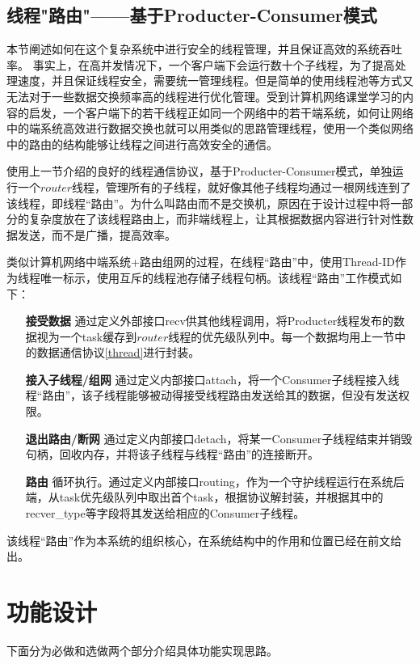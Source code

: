 \documentclass[UTF8]{ctexart}
\begin{document}
\subsection{线程"路由"——基于Producter-Consumer模式}\label{router}
本节阐述如何在这个复杂系统中进行安全的线程管理，并且保证高效的系统吞吐率。
事实上，在高并发情况下，一个客户端下会运行数十个子线程，为了提高处理速度，并且保证线程安全，需要统一管理线程。但是简单的使用线程池等方式又无法对于一些数据交换频率高的线程进行优化管理。受到计算机网络课堂学习的内容的启发，一个客户端下的若干线程正如同一个网络中的若干端系统，如何让网络中的端系统高效进行数据交换也就可以用类似的思路管理线程，使用一个类似网络中的路由的结构能够让线程之间进行高效安全的通信。

使用上一节介绍的良好的线程通信协议，基于Producter-Consumer模式，单独运行一个$router$线程，管理所有的子线程，就好像其他子线程均通过一根网线连到了该线程，即线程“路由”。为什么叫路由而不是交换机，原因在于设计过程中将一部分的复杂度放在了该线程路由上，而非端线程上，让其根据数据内容进行针对性数据发送，而不是广播，提高效率。

类似计算机网络中端系统+路由组网的过程，在线程“路由”中，使用Thread-ID作为线程唯一标示，使用互斥的线程池存储子线程句柄。该线程“路由”工作模式如下：
\begin{itemize}
    \item[\textbf{接受数据}]通过定义外部接口recv供其他线程调用，将Producter线程发布的数据视为一个task缓存到$router$线程的优先级队列中。每一个数据均用上一节中的数据通信协议\ref{thread}进行封装。
    \item[\textbf{接入子线程/组网}]通过定义内部接口attach，将一个Consumer子线程接入线程“路由”，该子线程能够被动得接受线程路由发送给其的数据，但没有发送权限。
    \item[\textbf{退出路由/断网}]通过定义内部接口detach，将某一Consumer子线程结束并销毁句柄，回收内存，并将该子线程与线程“路由”的连接断开。
    \item[\textbf{路由}]循环执行。通过定义内部接口routing，作为一个守护线程运行在系统后端，从task优先级队列中取出首个task，根据协议解封装，并根据其中的recver\_type等字段将其发送给相应的Consumer子线程。
\end{itemize}

该线程“路由”作为本系统的组织核心，在系统结构中的作用和位置已经在前文给出。%


\section{功能设计}
下面分为必做和选做两个部分介绍具体功能实现思路。
\end{document}
